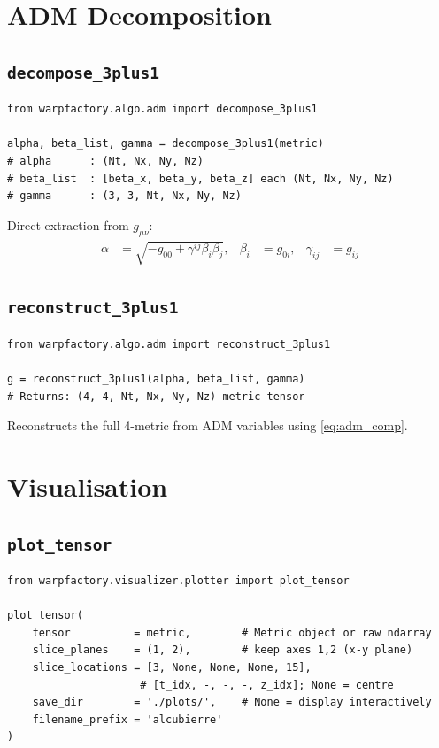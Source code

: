 \documentclass[11pt, a4paper, twoside]{report}
\begin{document}
\chapter{ADM Decomposition}
\label{chap:adm}

\section{\texttt{decompose\_3plus1}}

\begin{lstlisting}
from warpfactory.algo.adm import decompose_3plus1

alpha, beta_list, gamma = decompose_3plus1(metric)
# alpha      : (Nt, Nx, Ny, Nz)
# beta_list  : [beta_x, beta_y, beta_z] each (Nt, Nx, Ny, Nz)
# gamma      : (3, 3, Nt, Nx, Ny, Nz)
\end{lstlisting}

Direct extraction from $g_{\mu\nu}$:
\begin{align*}
  \alpha &= \sqrt{-g_{00} + \gamma^{ij}\beta_i\beta_j}, &
  \beta_i &= g_{0i}, &
  \gamma_{ij} &= g_{ij}
\end{align*}

\section{\texttt{reconstruct\_3plus1}}

\begin{lstlisting}
from warpfactory.algo.adm import reconstruct_3plus1

g = reconstruct_3plus1(alpha, beta_list, gamma)
# Returns: (4, 4, Nt, Nx, Ny, Nz) metric tensor
\end{lstlisting}

Reconstructs the full 4-metric from ADM variables using
\cref{eq:adm_comp}.

\chapter{Visualisation}
\label{chap:vis}

\section{\texttt{plot\_tensor}}

\begin{lstlisting}
from warpfactory.visualizer.plotter import plot_tensor

plot_tensor(
    tensor          = metric,        # Metric object or raw ndarray
    slice_planes    = (1, 2),        # keep axes 1,2 (x-y plane)
    slice_locations = [3, None, None, None, 15],
                     # [t_idx, -, -, -, z_idx]; None = centre
    save_dir        = './plots/',    # None = display interactively
    filename_prefix = 'alcubierre'
)
\end{lstlisting}
\end{document}
